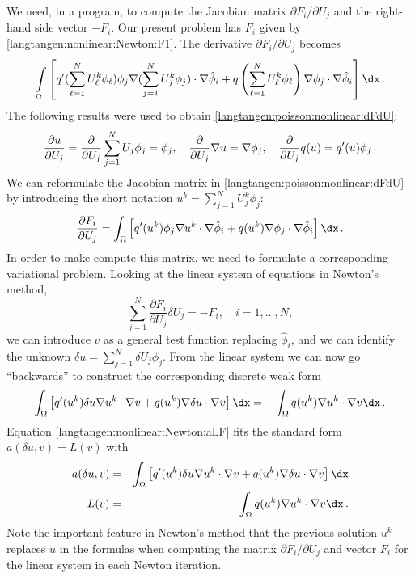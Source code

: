 We need, in a program, to compute the Jacobian matrix $\partial
F_i/\partial U_j$ and the right-hand side vector $-F_i$.  Our present
problem has $F_i$ given by \eqref{langtangen:nonlinear:Newton:F1}.
The derivative $\partial F_i/\partial U_j$ becomes
\begin{equation}
\int\limits_\Omega \left\lbrack
 q'(\sum_{\ell=1}^NU_\ell^k\phi_\ell)\phi_j
\nabla (\sum_{j=1}^NU_j^k\phi_j)\cdot \nabla \hat\phi_i
+
q\left(\sum_{\ell=1}^NU_\ell^k\phi_\ell\right)
\nabla \phi_j \cdot \nabla \hat\phi_i
\right\rbrack
\dx\langtangenep
\label{langtangen:poisson:nonlinear:dFdU}
\end{equation}
The following results were used to obtain \eqref{langtangen:poisson:nonlinear:dFdU}:
\begin{equation}
\frac{\partial u}{\partial U_j} = \frac{\partial}{\partial U_j}
\sum_{j=1}^NU_j\phi_j = \phi_j,\quad \frac{\partial}{\partial U_j}\nabla u
      = \nabla\phi_j,\quad \frac{\partial}{\partial U_j}q(u) = q'(u)\phi_j\thinspace .
\end{equation}
We can reformulate the Jacobian matrix
in \eqref{langtangen:poisson:nonlinear:dFdU} by introducing the short
notation $u^k = \sum_{j=1}^NU_j^k\phi_j$:
\begin{equation}
\frac{\partial F_i}{\partial U_j} =
\int_\Omega \left\lbrack
q'(u^k)\phi_j
\nabla u^k \cdot \nabla \hat\phi_i
+
q(u^k)
\nabla \phi_j \cdot \nabla \hat\phi_i
\right\rbrack
\dx\langtangenep
\end{equation}
In order to make \fenics{} compute this matrix, we need to formulate a
corresponding variational problem. Looking at the
linear system of equations in Newton's method,
\[ \sum_{j=1}^N \frac{\partial F_i}{\partial U_j}\delta U_j = -F_i,\quad
i=1,\ldots,N,\]
we can introduce $v$ as a general test function replacing $\hat\phi_i$,
and we can identify the unknown
$\delta u = \sum_{j=1}^N\delta U_j\phi_j$. From the linear system
we can now go ``backwards'' to construct the corresponding
discrete weak form
\begin{equation}
\label{langtangen:nonlinear:Newton:aLF}
\int_\Omega \left\lbrack
q'(u^k)\delta u
\nabla u^k \cdot \nabla v
+
q(u^k)
\nabla \delta u\cdot \nabla v
\right\rbrack
\dx = - \int_\Omega q(u^k)
\nabla u^k\cdot \nabla v \dx\langtangenep
\end{equation}
Equation \eqref{langtangen:nonlinear:Newton:aLF} fits the standard form
$a(\delta u,v)=L(v)$ with
\begin{eqnarray}
a(\delta u,v) &=&
\int_\Omega \left\lbrack
q'(u^k)\delta u
\nabla u^k \cdot \nabla v
+
q(u^k)
\nabla \delta u \cdot \nabla v
\right\rbrack
\dx\\
L(v) &=& - \int_\Omega q(u^k)
\nabla u^k\cdot \nabla v \dx\langtangenep
\end{eqnarray}
Note the important feature in Newton's method
that the
previous solution $u^k$ replaces $u$
in the formulas when computing the matrix
$\partial F_i/\partial U_j$ and vector $F_i$ for the linear system in
each Newton iteration.

